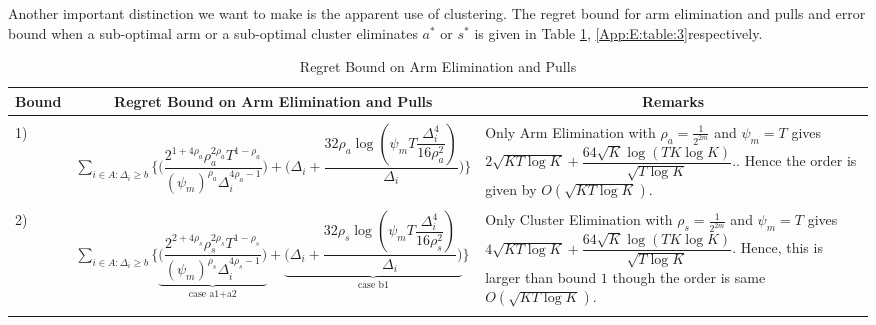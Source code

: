 \begin{remark}
\label{App:E:Rem:1}
Another important distinction we want to make is the apparent use of clustering. The regret bound for arm elimination and pulls and error bound when a sub-optimal arm or a sub-optimal cluster eliminates $a^{*}$ or $s^{*}$ is given in Table \ref{App:E:table:2}, \ref{App:E:table:3}respectively.
\newline
\begin{table}
\caption{Regret Bound on Arm Elimination and Pulls}
\label{App:E:table:2}
\begin{center}
\begin{tabular}{p{0.5cm}p{11cm}p{5cm}}
\multicolumn{1}{c}{\bf Bound} &\multicolumn{1}{c}{\bf Regret Bound on Arm Elimination and Pulls} &\multicolumn{1}{c}{\bf Remarks} \\
\hline \\
1)	&$\sum_{i\in A:\Delta_{i}\geq b}\bigg\lbrace\bigg(\dfrac{2^{1+4\rho_{a}}\rho_{a}^{2\rho_{a}}T^{1-\rho_{a}}}{(\psi_{m})^{\rho_{a}}\Delta_{i}^{4\rho_{a}-1}}\bigg) + \bigg(\Delta_{i}+\dfrac{32\rho_{a}\log{(\psi_{m}T\dfrac{\Delta_{i}^{4}}{16\rho_{a}^{2}})}}{\Delta_{i}}\bigg)\bigg\rbrace$ &Only Arm Elimination with $\rho_{a}=\frac{1}{2^{2m}}$ and $\psi_{m}=T$ gives $ 2\sqrt{KT\log K} +\dfrac{64\sqrt{K}\log{(TK\log K)}}{\sqrt{T\log K}}. $. Hence the order is given by $O(\sqrt{KT\log K})$.\\
\hline\\
2)	&$ \sum_{i\in A:\Delta_{i}\geq b}\bigg\lbrace\underbrace{\bigg(\dfrac{2^{2+4\rho_{s}}\rho_{s}^{2\rho_{s}}T^{1-\rho_{s}}}{(\psi_{m})^{\rho_{s}}\Delta_{i}^{4\rho_{s}-1}}\bigg)}_{\text{case a1+a2}} +  \underbrace{\bigg(\Delta_{i}+\dfrac{32\rho_{s}\log{(\psi_{m}T\dfrac{\Delta_{i}^{4}}{16\rho_{s}^{2}})}}{\Delta_{i}}\bigg)}_{\text{case b1}}\bigg\rbrace$ &Only Cluster Elimination with $\rho_{s}=\frac{1}{2^{2m}}$ and  $\psi_{m}=T$ gives $ 4\sqrt{KT\log K} +\dfrac{64\sqrt{K}\log{(TK\log K)}}{\sqrt{T\log K}}$. Hence, this is larger than bound $1$ though the order is same $O(\sqrt{KT\log K})$.\\
\hline\\

\end{tabular}
\end{center}
\end{table}
\end{remark}
